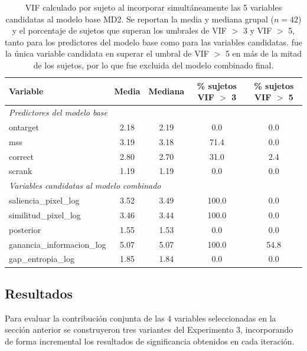 \begin{table}[H]
\centering
\small
\begin{tabular}{lcccc}
\toprule
\textbf{Variable} & \textbf{Media} & \textbf{Mediana} & \textbf{\% sujetos VIF $>$ 3} & \textbf{\% sujetos VIF $>$ 5} \\
\midrule
\multicolumn{5}{l}{\textit{Predictores del modelo base}} \\
ontarget                 & 2.18 & 2.19 & 0.0   & 0.0 \\
mss                      & 3.19 & 3.18 & 71.4  & 0.0 \\
correct                  & 2.80 & 2.70 & 31.0  & 2.4 \\
scrank                   & 1.19 & 1.19 & 0.0   & 0.0 \\
\midrule
\multicolumn{5}{l}{\textit{Variables candidatas al modelo combinado}} \\
saliencia\_pixel\_log         & 3.52 & 3.49 & 100.0 & 0.0 \\
similitud\_pixel\_log         & 3.46 & 3.44 & 100.0 & 0.0 \\
posterior                     & 1.55 & 1.53 & 0.0   & 0.0 \\
ganancia\_informacion\_log    & 5.07 & 5.07 & 100.0 & 54.8 \\
gap\_entropia\_log            & 1.85 & 1.84 & 0.0   & 0.0 \\
\bottomrule
\end{tabular}
\caption{VIF calculado por sujeto al incorporar simultáneamente las 5 variables
candidatas al modelo base MD2. Se reportan la media y mediana grupal ($n=42$) y el
porcentaje de sujetos que superan los umbrales de VIF $>$ 3 y VIF $>$ 5, tanto para
los predictores del modelo base como para las variables candidatas.
 fue la única variable candidata en superar el umbral
de VIF $>$ 5 en más de la mitad de los sujetos, por lo que fue excluida del modelo
combinado final.}
\label{tab:vif_combinado_5}
\end{table}

\subsection{Resultados}

Para evaluar la contribución conjunta de las 4 variables seleccionadas en la sección
anterior se construyeron tres variantes del Experimento 3,
incorporando de forma incremental los resultados de significancia obtenidos en cada
iteración.


